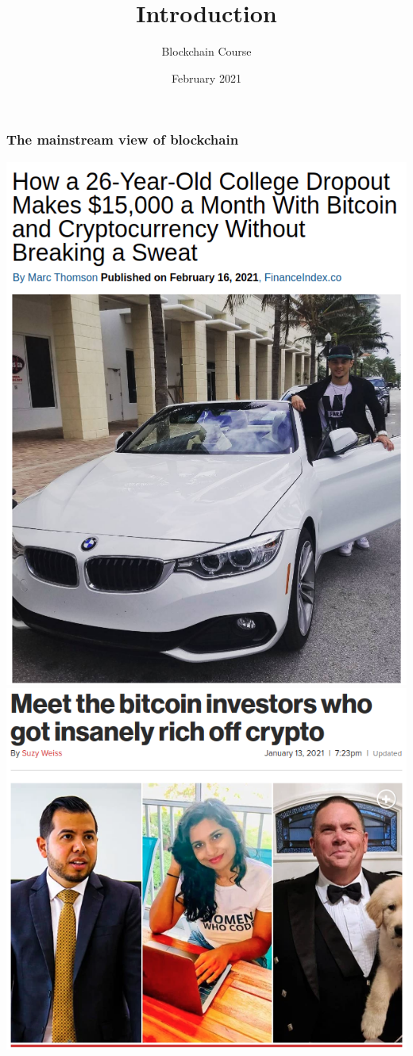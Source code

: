 \documentclass[11pt]{beamer}  %
\subtitle{Blockchain Course}
\title{Introduction}
\institute{Universit\`a di Verona, Italy}
\date{February 2021}
\begin{document}
\begin{frame}
  \titlepage
\end{frame}

\begin{frame}\frametitle{The mainstream view of blockchain}

  \begin{center}
    \includegraphics[scale=0.209,clip=false]{pictures/dropout.png}
    \hspace*{2ex}
    \includegraphics[scale=0.29,clip=false]{pictures/insane.png}
  \end{center}


\end{frame}
\end{document}
